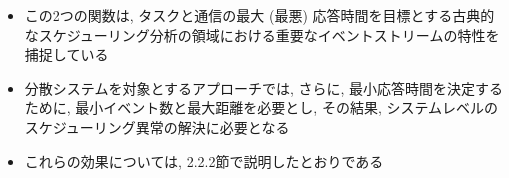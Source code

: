\begin{frame}{}
    \begin{itemize}
        \item この2つの関数は, タスクと通信の最大 (最悪) 応答時間を目標とする古典的なスケジューリング分析の領域における重要なイベントストリームの特性を捕捉している
        \item 分散システムを対象とするアプローチでは, さらに, 最小応答時間を決定するために, 最小イベント数と最大距離を必要とし, その結果, システムレベルのスケジューリング異常の解決に必要となる
        \item これらの効果については, 2.2.2節で説明したとおりである
    \end{itemize}
\end{frame}

\begin{frame}{}
\end{frame}
